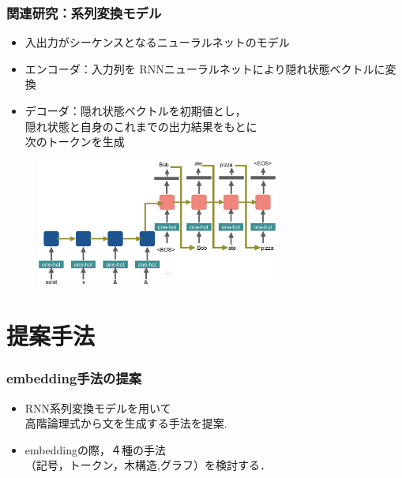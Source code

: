 \documentclass[dvipdfmx]{beamer}
\begin{document}
\begin{frame}
\frametitle{関連研究：系列変換モデル\citep{seq2seq} }
\begin{itemize}
  \item 入出力がシーケンスとなるニューラルネットのモデル
  \item エンコーダ：入力列を RNNニューラルネットにより隠れ状態ベクトルに変換
  \item デコーダ：隠れ状態ベクトルを初期値とし，\\隠れ状態と自身のこれまでの出力結果をもとに\\次のトークンを生成
\end{itemize}

\begin{center}
\begin{figure}[h]
	\includegraphics[width=8cm]{learn_model.png}
        \label{fig:seq2seq}
\end{figure}
\end{center}

\end{frame}


\section{提案手法}
\begin{frame}
\frametitle{embedding手法の提案}
\begin{center}
\end{center}
\begin{itemize}
  \item RNN系列変換モデルを用いて\\高階論理式から文を生成する手法を提案.
  \item embeddingの際，４種の手法\\{\color{berry}（記号，トークン，木構造,グラフ）}を検討する．
\end{itemize}

\end{frame}
\end{document}
